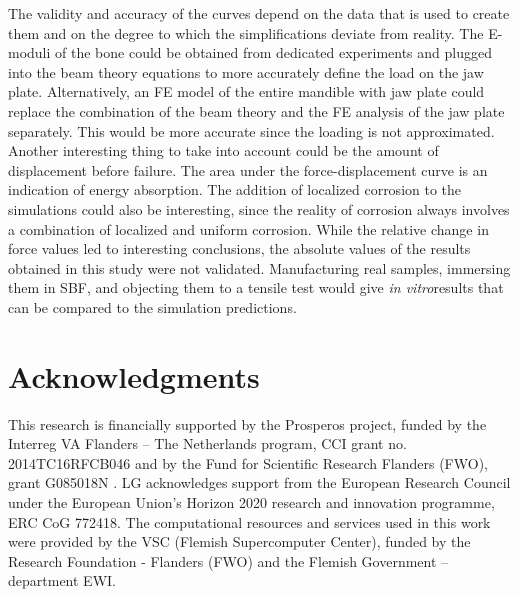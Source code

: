 The validity and accuracy of the curves depend on the data that is used to create them and on the degree to which the simplifications deviate from reality. The E-moduli of the bone could be obtained from dedicated experiments and plugged into the beam theory equations to more accurately define the load on the jaw plate. Alternatively, an FE model of the entire mandible with jaw plate could replace the combination of the beam theory and the FE analysis of the jaw plate separately. This would be more accurate since the loading is not approximated. Another interesting thing to take into account could be the amount of displacement before failure. The area under the force-displacement curve is an indication of energy absorption. The addition of localized corrosion to the simulations could also be interesting, since the reality of corrosion always involves a combination of localized and uniform corrosion. While the relative change in force values led to interesting conclusions, the absolute values of the results obtained in this study were not validated. Manufacturing real samples, immersing them in SBF, and objecting them to a tensile test would give \textit{in vitro}results that can be compared to the simulation predictions.  


\section*{Acknowledgments}

This research is financially supported by the Prosperos project, funded by the Interreg VA Flanders – The Netherlands program, CCI grant no. 2014TC16RFCB046 and by the Fund for Scientific Research Flanders (FWO), grant G085018N . LG acknowledges support from the European Research Council under the European Union’s Horizon 2020 research and innovation programme, ERC CoG 772418. The computational resources and services used in this work were provided by the VSC (Flemish Supercomputer Center), funded by the Research Foundation - Flanders (FWO) and the Flemish Government – department EWI.


\cleardoublepage

